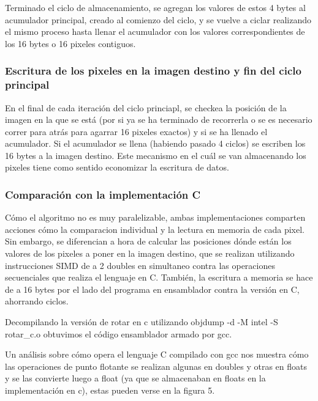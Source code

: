 Terminado el ciclo de almacenamiento, se agregan los valores de estos 4 bytes al acumulador principal, creado al comienzo del ciclo, y se vuelve a ciclar realizando el mismo proceso hasta llenar el acumulador con los valores correspondientes de los 16 bytes o 16 pixeles contiguos.

\subsubsection{Escritura de los pixeles en la imagen destino y fin del ciclo principal}

En el final de cada iteración del ciclo princiapl, se checkea la posición de la imagen en la que se está (por si ya se ha terminado de recorrerla o se es necesario correr para atrás para agarrar 16 pixeles exactos) y si se ha llenado el acumulador. Si el acumulador se llena (habiendo pasado 4 ciclos) se escriben los 16 bytes a la imagen destino. Este mecanismo en el cuál se van almacenando los pixeles tiene como sentido economizar la escritura de datos.

\subsubsection{Comparación con la implementación C}
Cómo el algoritmo no es muy paralelizable, ambas implementaciones comparten acciones cómo la comparacion individual y la lectura en memoria de cada pixel. Sin embargo, se diferencian a hora de calcular las posiciones dónde están los valores de los pixeles a poner en la imagen destino, que se realizan utilizando instrucciones SIMD de a 2 doubles en simultaneo contra las operaciones secuenciales que realiza el lenguaje en C. También, la escritura a memoria se hace de a 16 bytes por el lado del programa en ensamblador contra la versión en C, ahorrando ciclos.

Decompilando la versión de rotar en c utilizando objdump -d -M intel -S rotar\_c.o obtuvimos el código ensamblador armado por gcc.


Un análisis sobre cómo opera el lenguaje C compilado con gcc nos muestra cómo las operaciones de punto flotante se realizan algunas en doubles y otras en floats y se las convierte luego a float (ya que se almacenaban en floats en la implementación en c), estas pueden verse en la figura 5.

